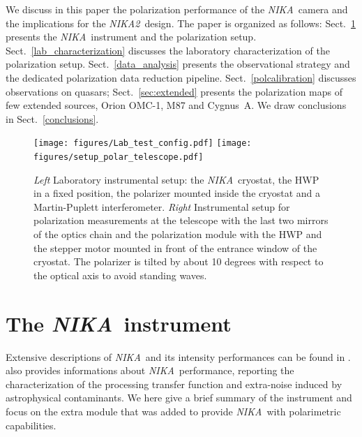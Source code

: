 \documentclass[twocolumn, traditabstract]{aa}
\newcommand{\nika}{{\it NIKA}}
\newcommand{\nikad}{{\it NIKA2}}
\begin{document}
We discuss in this paper the
polarization performance of the \nika\ camera and the implications for the
\nikad\ design.
The paper is organized as follows: Sect.~\ref{nika instrument} presents the
\nika\ instrument and the polarization
setup. 
Sect.~\ref{lab_characterization} discusses the laboratory
characterization of the polarization setup. Sect.~\ref{data_analysis}
presents the observational strategy and the dedicated polarization data reduction
pipeline.  Sect.~\ref{polcalibration} discusses
observations on quasars; Sect.~\ref{sec:extended} presents the polarization
maps of few extended sources, Orion OMC-1, M87 and Cygnus~A. 
We draw conclusions in  Sect.~\ref{conclusions}.
\begin{figure}
  \begin{center}
    \texttt{[image: figures/Lab\_test\_config.pdf]}
    \texttt{[image: figures/setup\_polar\_telescope.pdf]}
    \caption{{\it Left} Laboratory instrumental setup: the \nika\ cryostat,
      the HWP in a fixed position, the polarizer mounted inside the cryostat and a Martin-Puplett interferometer. {\it Right}
      Instrumental setup for polarization measurements at the telescope with the last two mirrors of the optics chain and the polarization
        module with the HWP and the stepper motor mounted in front of the
        entrance window of the cryostat. The polarizer is tilted by about 10
        degrees with respect to the optical axis to avoid standing waves.}
         \label{polarsetup}
  \end{center}
\end{figure}
\section{The \nika\ instrument}
\label{nika instrument}
Extensive descriptions of \nika\ and its intensity performances can be found
in \cite{adam2014,catalano2014, monfardini2010, monfardini2011, Calvo2013}.
\cite{adam2015,adam2016} also provides informations about \nika\ performance, reporting the characterization of the processing transfer function and extra-noise induced by astrophysical contaminants. 
We here give a brief summary of the instrument and focus on the extra module that was added to
provide \nika\ with polarimetric capabilities.
\end{document}
